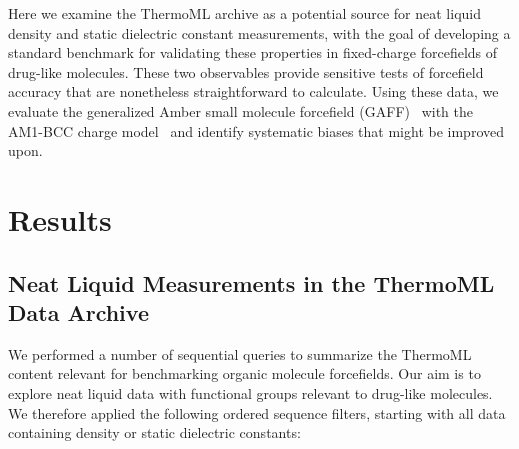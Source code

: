 \documentclass[aps,pre,twocolumn,nofootinbib,superscriptaddress,linenumbers]{revtex4-1}
\begin{document}
Here we examine the ThermoML archive as a potential source for neat liquid density and static dielectric constant measurements, with the goal of developing a standard benchmark for validating these properties in fixed-charge forcefields of drug-like molecules.  
These two observables provide sensitive tests of forcefield accuracy that are nonetheless straightforward to calculate.  
Using these data, we evaluate the generalized Amber small molecule forcefield (GAFF)~\cite{gaff} with the AM1-BCC charge model~\cite{am1bcc1,am1bcc2} and identify systematic biases that might be improved upon.


\section{Results}

\subsection{Neat Liquid Measurements in the ThermoML Data Archive}

We performed a number of sequential queries to summarize the ThermoML content relevant for benchmarking organic molecule forcefields.  
Our aim is to explore neat liquid data with functional groups relevant to drug-like molecules.  
We therefore applied the following ordered sequence filters, starting with all data containing density or static dielectric constants: 
\end{document}
